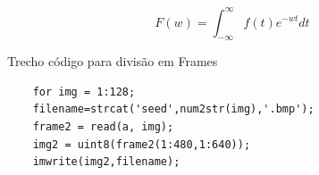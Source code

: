 \begin{equation} \label{eq:03}
F(w)=\int_{-\infty }^{\infty} f(t)e^{-wt} dt
\end{equation}



\begin{listing}[H]
    \caption{Trecho código para divisão em Frames}
    \label{labelFrame}
	\begin{verbatim}
    for img = 1:128;
    filename=strcat('seed',num2str(img),'.bmp'); 
    frame2 = read(a, img);
    img2 = uint8(frame2(1:480,1:640));
    imwrite(img2,filename);
	\end{verbatim}
	\label{cod2}

\end{listing}


